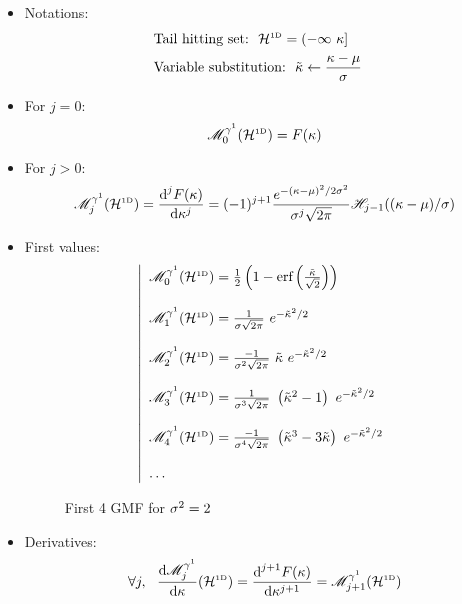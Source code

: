 \documentclass[12pt]{article}
\begin{document}
\begin{itemize}
\item Notations:
  \begin{subequations}
    \begin{flalign}
      & \text{Tail hitting set:} \ \ \mathcal{H}^{\text{\tiny1D}}=(-\infty\ \kappa] & \\
      & \text{Variable substitution:} \ \ \tilde{\kappa} \leftarrow \frac{\kappa-\mu}{\sigma} &
    \end{flalign}
  \end{subequations}
\item For $j=0$:
\begin{equation}
  \mathscr{M}^{\gamma^1}_0(\mathcal{H}^{\text{\tiny1D}})=F(\kappa)
\end{equation}
\item For $j>0$:
\begin{equation}
  \mathscr{M}^{\gamma^1}_j(\mathcal{H}^{\text{\tiny1D}})=\frac{\text{d}^jF(\kappa)}{\text{d}\kappa^j}=(-1)^{j+1}\frac{e^{-(\kappa-\mu)^2/2\sigma^2}}{\sigma^j\sqrt{2\pi}}\mathscr{H}_{j-1}((\kappa-\mu)/\sigma)
\end{equation}
\item First values:
\begin{equation}
  \left|
  \begin{array}{l}
    \GMFa_0(\HSC) = \frac{1}{2}\left(1-\erf\left(\frac{\clset}{\sqrt{2}}\right)\right) \\ \\
    \GMFa_1(\HSC) = \frac{1}{\std  \sqrt{2\pi}}\ e^{-\clset^2/2} \\ \\
    \GMFa_2(\HSC) = \frac{-1}{\std^2\sqrt{2\pi}}\ \clset \ e^{-\clset^2/2} \\ \\
    \GMFa_3(\HSC) = \frac{1}{\std^3\sqrt{2\pi}}\ \left(\clset^2-1\right) \ e^{-\clset^2/2} \\ \\
    \GMFa_4(\HSC) = \frac{-1}{\std^4\sqrt{2\pi}}\ \left(\clset^3-3\clset\right) \ e^{-\clset^2/2} \\ \\
    \dots
  \end{array}
  \right.
\end{equation}
\begin{figure}[!h]
  \centering
  \hspace*{\fill}
  \subfigure[$\HS=\HSC=\uinf$]{\scalebox{0.5}{}}\hfill
  \subfigure[$\HS=\HSC=\minfu$]{\scalebox{0.5}{}}\hspace*{\fill}
  \caption{First 4 GMF for $\sigma^2=2$}
\end{figure}
\item Derivatives:
\begin{equation}
  \forall j, \ \ \frac{\text{d}\GMFa_j}{\text{d}\lset}(\HSC)=\frac{\text{d}^{j+1}\CDP(\lset)}{\text{d}\lset^{j+1}}=\GMFa_{j+1}(\HSC)
\end{equation}
\end{itemize}
\end{document}

